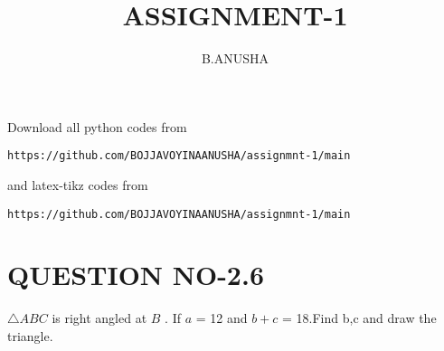 \documentclass[journal,12pt,twocolumn]{IEEEtran}
\begin{document}
     \def\rightbox#1{\makebox[0in][r]{#1}}
     \def\centbox#1{\makebox[0in]{#1}}
     \def\topbox#1{\raisebox{-\baselineskip}[0in][0in]{#1}}
     \def\midbox#1{\raisebox{-0.5\baselineskip}[0in][0in]{#1}}
\vspace{3cm}
\title{ASSIGNMENT-1}
\author{B.ANUSHA}
\maketitle
\newpage
\bigskip
\renewcommand{\thefigure}{\theenumi}
\renewcommand{\thetable}{\theenumi}
Download all python codes from 
\begin{lstlisting}
https://github.com/BOJJAVOYINAANUSHA/assignmnt-1/main
\end{lstlisting}
%
and latex-tikz codes from 
\begin{lstlisting}
https://github.com/BOJJAVOYINAANUSHA/assignmnt-1/main
\end{lstlisting}
%
\section{QUESTION NO-2.6}
$\triangle ABC$ is right angled at $B$ . If $a$ = 12 and $b+c$ = 18.Find b,c and draw the triangle.
%
\end{document}
